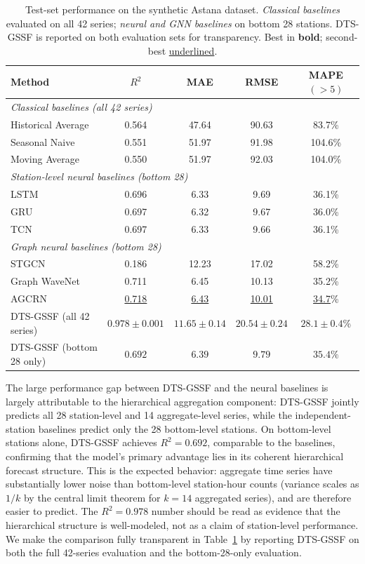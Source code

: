 \begin{table}[H]
\centering
\small
\caption{Test-set performance on the synthetic Astana dataset. \textit{Classical baselines} evaluated on all 42 series; \textit{neural and GNN baselines} on bottom 28 stations. DTS-GSSF is reported on both evaluation sets for transparency. Best in \textbf{bold}; second-best \underline{underlined}.}
\label{Tab.main_results}
\begin{tabular}{lcccc}
\toprule
Method & $R^2$ & MAE & RMSE & MAPE$(>5)$ \\
\midrule
\multicolumn{5}{l}{\textit{Classical baselines (all 42 series)}} \\
Historical Average & 0.564 & 47.64 & 90.63 & 83.7\% \\
Seasonal Naive      & 0.551 & 51.97 & 91.98 & 104.6\% \\
Moving Average      & 0.550 & 51.97 & 92.03 & 104.0\% \\
\midrule
\multicolumn{5}{l}{\textit{Station-level neural baselines (bottom 28)}} \\
LSTM  & 0.696 & 6.33 & 9.69  & 36.1\% \\
GRU   & 0.697 & 6.32 & 9.67  & 36.0\% \\
TCN   & 0.697 & 6.33 & 9.66  & 36.1\% \\
\midrule
\multicolumn{5}{l}{\textit{Graph neural baselines (bottom 28)}} \\
STGCN        & 0.186 & 12.23 & 17.02 & 58.2\% \\
Graph WaveNet & 0.711 & 6.45  & 10.13 & 35.2\% \\
AGCRN        & \underline{0.718} & \underline{6.43} & \underline{10.01} & \underline{34.7}\% \\
\midrule
DTS-GSSF (all 42 series)    & $\mathbf{0.978 \pm 0.001}$ & $\mathbf{11.65 \pm 0.14}$ & $\mathbf{20.54 \pm 0.24}$ & $\mathbf{28.1 \pm 0.4}$\% \\
DTS-GSSF (bottom 28 only)   & $0.692$ & $6.39$ & $9.79$ & $35.4\%$ \\
\bottomrule
\end{tabular}
\end{table}

The large performance gap between DTS-GSSF and the neural baselines is largely attributable to the hierarchical aggregation component: DTS-GSSF jointly predicts all 28 station-level and 14 aggregate-level series, while the independent-station baselines predict only the 28 bottom-level stations. On bottom-level stations alone, DTS-GSSF achieves $R^2 = 0.692$, comparable to the baselines, confirming that the model's primary advantage lies in its coherent hierarchical forecast structure. This is the expected behavior: aggregate time series have substantially lower noise than bottom-level station-hour counts (variance scales as $1/k$ by the central limit theorem for $k = 14$ aggregated series), and are therefore easier to predict. The $R^2 = 0.978$ number should be read as evidence that the hierarchical structure is well-modeled, not as a claim of station-level performance. We make the comparison fully transparent in Table~\ref{Tab.main_results} by reporting DTS-GSSF on both the full 42-series evaluation and the bottom-28-only evaluation.

